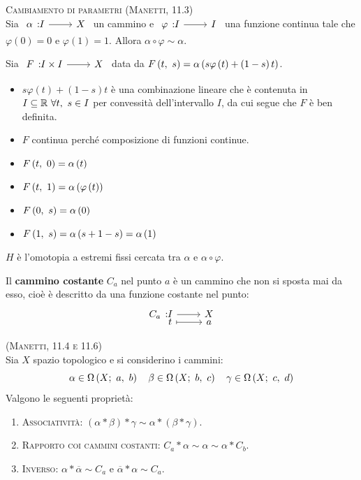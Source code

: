 \begin{lemming}\textsc{Cambiamento di parametri (Manetti, 11.3)}\\
	Sia $\funz{\alpha}{I}{X}$ un cammino e $\funz{\varphi}{I}{I}$ una funzione continua tale che $\varphi\left(0\right)=0$ e $\varphi\left(1\right)=1$. Allora $\alpha\circ \varphi\sim\alpha$.
\end{lemming}
\begin{demonstration}
	Sia $\funz{F}{I\times I}{X}$ data da $F\left(t,\ s\right)=\alpha\left(s\varphi\left(t\right)+\left(1-s\right)t\right)$.
	\begin{itemize}
		\item $s\varphi\left(t\right)+\left(1-s\right)t$ è una combinazione lineare che è contenuta in $I\subseteq \mathbb{R}\ \forall t,\ s\in I$ per convessità dell'intervallo $I$, da cui segue che $F$ è ben definita.
		\item $F$ continua perché composizione di funzioni continue.
		\item \parbox[t]{0.38\textwidth}{$F\left(t,\ 0\right)=\alpha\left(t\right)$}%
		\item \parbox[t]{0.38\textwidth}{$F\left(t,\ 1\right)=\alpha\left(\varphi\left(t\right)\right)$}%
		\item \parbox[t]{0.38\textwidth}{$F\left(0,\ s\right)=\alpha\left(0\right)$}%
		\item \parbox[t]{0.38\textwidth}{$F\left(1,\ s\right)=\alpha\left(s+1-s\right)=\alpha\left(1\right)$}%
	\end{itemize}
$H$ è l'omotopia a estremi fissi cercata tra $\alpha$ e $\alpha\circ\varphi$.
\end{demonstration}
\begin{define}
	Il \textbf{cammino costante} $C_a$ nel punto $a$ è un cammino che non si sposta mai da esso, cioè è descritto da una funzione costante nel punto:
	\begin{equation}
		\funztot{C_a}{I}{X}{t}{a}
	\end{equation}
\vspace{-6mm}
\end{define}
\begin{proposition}\textsc{(Manetti, 11.4 e 11.6)\label{propcammini}}\\
	Sia $X$ spazio topologico e si considerino i cammini:
	\begin{equation*}
	\alpha\in\Omega\left(X;\ a,\ b\right)\quad\beta\in\Omega\left(X;\ b,\ c\right)\quad\gamma\in\Omega\left(X;\ c,\ d\right)
	\end{equation*}
Valgono le seguenti proprietà:
\begin{enumerate}
	\item \textsc{Associatività}: $\left(\alpha\ast\beta\right)\ast \gamma \sim \alpha\ast\left(\beta\ast\gamma\right)$.
	\item \textsc{Rapporto coi cammini costanti}: $C_a\ast \alpha \sim \alpha \sim \alpha \ast C_b$. 
	\item \textsc{Inverso}: $\alpha\ast\overline{\alpha}\sim C_a$ e $\overline{\alpha}\ast\alpha\sim C_a$.
\end{enumerate}
\end{proposition}
